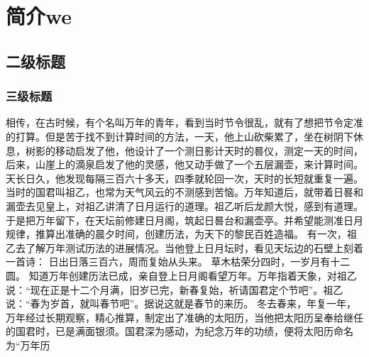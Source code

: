 \chapter{简介we}
\section{二级标题}
\subsection{三级标题}
{\kaishu 相传，在古时候，有个名叫万年的青年，看到当时节令很乱，就有了想把节令定准的打算。但是苦于找不到计算时间的方法，一天，他上山砍柴累了，坐在树阴下休息，树影的移动启发了他，他设计了一个测日影计天时的晷仪，测定一天的时间，后来，山崖上的滴泉启发了他的灵感，他又动手做了一个五层漏壶，来计算时间。天长日久，他发现每隔三百六十多天，四季就轮回一次，天时的长短就重复一遍。
当时的国君叫祖乙，也常为天气风云的不测感到苦恼。万年知道后，就带着日晷和漏壶去见皇上，对祖乙讲清了日月运行的道理。祖乙听后龙颜大悦，感到有道理。于是把万年留下，在天坛前修建日月阁，筑起日晷台和漏壶亭。并希望能测准日月规律，推算出准确的晨夕时间，创建历法，为天下的黎民百姓造福。
有一次，祖乙去了解万年测试历法的进展情况。当他登上日月坛时，看见天坛边的石壁上刻着一首诗：
日出日落三百六，周而复始从头来。
草木枯荣分四时，一岁月有十二圆。
知道万年创建历法已成，亲自登上日月阁看望万年。万年指着天象，对祖乙说：“现在正是十二个月满，旧岁已完，新春复始，祈请国君定个节吧”。祖乙说：“春为岁首，就叫春节吧”。据说这就是春节的来历。
冬去春来，年复一年，万年经过长期观察，精心推算，制定出了准确的太阳历，当他把太阳历呈奉给继任的国君时，已是满面银须。国君深为感动，为纪念万年的功绩，便将太阳历命名为“万年历

}